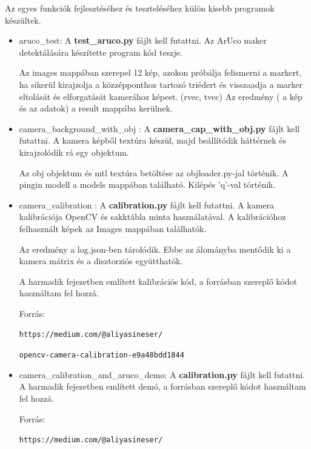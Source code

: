 

Az egyes funkciók fejlesztéséhez és teszteléséhez külön kisebb programok készültek.

\begin{itemize}
	\item aruco\_test:
	A \textbf{test\_aruco.py} fájlt kell futattni.
	Az ArUco maker detektálására készítette program kód teszje. 
	
	Az images mappában szerepel 12 kép, azokon próbálja felismerni a markert, ha sikerül kirajzolja a közzépponthoz
	tartozó triédert és visszaadja a marker eltolását és elforgatását kamerához képest. (rvec, tvec)
	Az eredmény ( a kép és az adatok) a result mappába kerülnek.
	\item camera\_background\_with\_obj :
	A \textbf{camera\_cap\_with\_obj.py} fájlt kell futattni.
	A kamera képből textúra készül, majd beállítódik háttérnek és kirajzolódik rá egy objektum.
	
	Az obj objektum és mtl textúra betöltése az objloader.py-jal történik.
	A pingin modell a models mappában található.
	Kilépés 'q'-val történik.
	\item camera\_calibration :
	A \textbf{calibration.py} fájlt kell futattni.
	A kamera kalibrációja OpenCV és sakktábla minta használatával.
	A kalibrációhoz felhasznált képek az Images mappában találhatók.
	
	Az eredmény a log.json-ben tárolódik.
	Ebbe az álományba mentődik ki a kamera mátrix és a disztorziós együtthatók.
	
	A harmadik fejezetben említett kalibrációs kód, a forrásban szereplő kódot használtam fel hozzá. 
	
	Forrás: 
	
	\texttt{https://medium.com/@aliyasineser/}
	
	\texttt{opencv-camera-calibration-e9a48bdd1844}
	\item camera\_calibration\_and\_aruco\_demo:
	A \textbf{calibration.py} fájlt kell futattni.
	A harmadik fejezetben említett demó, a forrásban szereplő kódot használtam fel hozzá. 
	
	Forrás: 
	
	\texttt{https://medium.com/@aliyasineser/}
	

\end{itemize}
